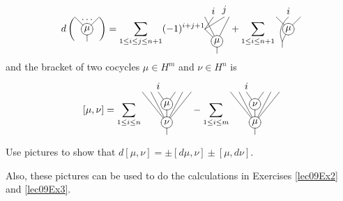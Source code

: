  \[ d \left(
 {\begin{xy}<\diagramsize,0em>:
   (1,0) *+{\mu} *\cir{};
   (0,1) **@{-}, (2,1) **@{-}, (1,-1) **@{-},
   (1,.8) *{\dots}
 \end{xy}} \right)
 =
 \sum_{1\le i\le j\le n+1} (-1)^{i+j+1}
 {\begin{xy}<\diagramsize,0em>:
   (.7,1) *+!D{i};(0,0) **@{-},
   (1.6,1) *+!D{j};(0,0) **@{-};
   (1,-1) *+{\mu} *\cir{} **@{-};
   (0,1) **@{-}, (2,1) **@{-}, (1,-2) **@{-},
 \end{xy}}
 + \sum_{1\le i\le n+1}
 {\begin{xy}<\diagramsize,0em>:
   (1,0) *+{\mu} *\cir{};
   (0,1) **@{-}, (2,1) **@{-}, (.5,-1) **@{-},
   (1,1) *+!D{i}; (.5,-1) **\crv{(0,0)};
   (.5,-1.5) **@{-}
 \end{xy}}
 \]
and the bracket of two cocycles $\mu \in H^m$ and $\nu \in H^n$ is
 \[ [\mu, \nu] = \sum_{1\le i\le n}
 {\begin{xy}<\diagramsize,0em>:
   (1,.5) *+{\mu} *\cir{};
   (.3,1.5) *+!D{i} **@{-}, (1.7,1.5) **@{-},
   (1,-1) *+{\nu} *\cir{} **@{-};
   (-1,1.5) **@{-}, (-.3,1.5) **@{-}, (2.3,1.5) **@{-}, (3,1.5) **@{-}, (1,-2) **@{-},
 \end{xy}}
 - \sum_{1\le i\le m}
 {\begin{xy}<\diagramsize,0em>:
   (1,.5) *+{\nu} *\cir{};
   (.3,1.5) *+!D{i} **@{-}, (1.7,1.5) **@{-},
   (1,-1) *+{\mu} *\cir{} **@{-};
   (-1,1.5) **@{-}, (-.3,1.5) **@{-}, (2.3,1.5) **@{-}, (3,1.5) **@{-}, (1,-2) **@{-},
 \end{xy}}
 \]
 \begin{exercise}
   Use pictures to show that $d[\mu,\nu]=\pm [d\mu, \nu] \pm [\mu, d\nu]$.
 \end{exercise}
 Also, these pictures can be used to do the calculations in Exercises \ref{lec09Ex2}
 and \ref{lec09Ex3}.
